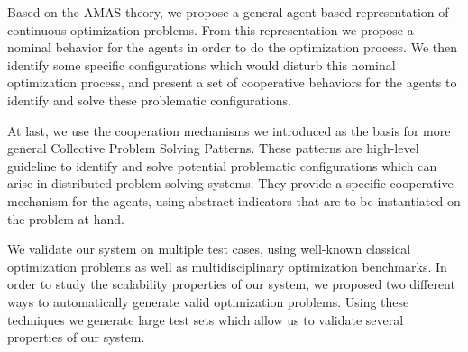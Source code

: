 Based on the AMAS theory, we propose a general agent-based representation of continuous optimization problems. From this representation we propose a nominal behavior for the agents in order to do the optimization process. We then identify some specific configurations which would disturb this nominal optimization process, and present a set of cooperative behaviors for the agents to identify and solve these problematic configurations.

At last, we use the cooperation mechanisms we introduced as the basis for more general Collective Problem Solving Patterns. These patterns are high-level guideline to identify and solve potential problematic configurations which can arise in distributed problem solving systems. They provide a specific cooperative mechanism for the agents, using abstract indicators that are to be instantiated on the problem at hand.

We validate our system on multiple test cases, using well-known classical optimization problems as well as multidisciplinary optimization benchmarks. In order to study the scalability properties of our system, we proposed two different ways to automatically generate valid optimization problems. Using these techniques we generate large test sets which allow us to validate several properties of our system.

\vspace{-0.4cm}
\begin{center}{\hrulefill}\end{center}
\cleardoublepage